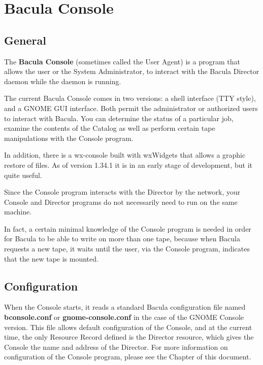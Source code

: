 
\section*{Bacula Console}
\label{_ChapterStart23}

\subsection*{General}

The {\bf Bacula Console} (sometimes called the User Agent) is a program that
allows the user or the System Administrator, to interact with the Bacula
Director daemon while the daemon is running. 

The current Bacula Console comes in two versions: a shell interface (TTY
style), and a GNOME GUI interface. Both permit the administrator or authorized
users to interact with Bacula. You can determine the status of a particular
job, examine the contents of the Catalog as well as perform certain tape
manipulations with the Console program. 

In addition, there is a wx-console built with wxWidgets that allows a graphic
restore of files. As of version 1.34.1 it is in an early stage of development,
but it quite useful. 

Since the Console program interacts with the Director by the network, your
Console and Director programs do not necessarily need to run on the same
machine. 

In fact, a certain minimal knowledge of the Console program is needed in order
for Bacula to be able to write on more than one tape, because when Bacula
requests a new tape, it waits until the user, via the Console program,
indicates that the new tape is mounted. 

\subsection*{Configuration}

When the Console starts, it reads a standard Bacula configuration file named
{\bf bconsole.conf} or {\bf gnome-console.conf} in the case of the GNOME
Console version. This file allows default configuration of the Console, and at
the current time, the only Resource Record defined is the Director resource,
which gives the Console the name and address of the Director. For more
information on configuration of the Console program, please see the 
 Chapter of
this document. 

